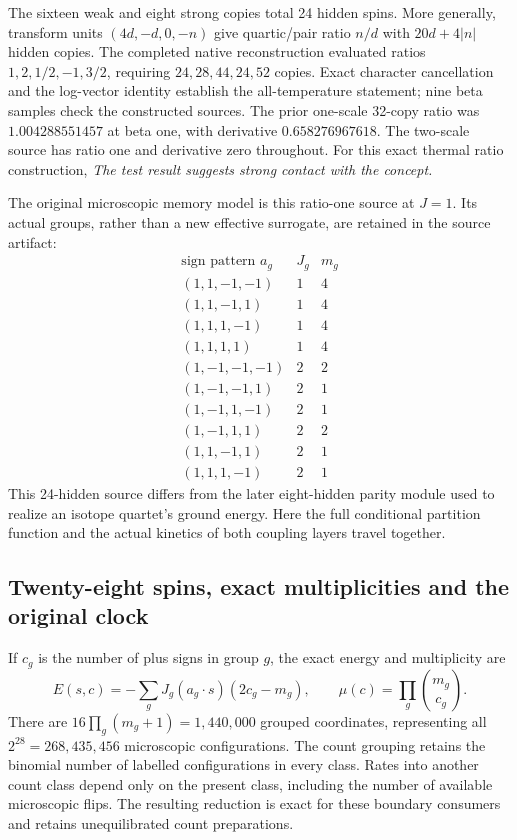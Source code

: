 The sixteen weak and eight strong copies total 24 hidden spins. More
generally, transform units \((4d,-d,0,-n)\) give quartic/pair ratio \(n/d\)
with \(20d+4|n|\) hidden copies. The completed native reconstruction
evaluated ratios \(1,2,1/2,-1,3/2\), requiring \(24,28,44,24,52\) copies.
Exact character cancellation and the log-vector identity establish the
all-temperature statement; nine beta samples check the constructed
sources. The prior one-scale 32-copy ratio was \(1.004288551457\) at
beta one, with derivative \(0.658276967618\). The two-scale source
has ratio one and derivative zero throughout. For this exact thermal
ratio construction, \emph{The test result suggests strong contact with
the concept.}

The original microscopic memory model is this ratio-one source at \(J=1\).
Its actual groups, rather than a new effective surrogate, are retained in
the source artifact:
\[
\begin{array}{c|c|c}
\text{sign pattern }a_g&J_g&m_g\\
\hline
(1,1,-1,-1)&1&4\\
(1,1,-1,1)&1&4\\
(1,1,1,-1)&1&4\\
(1,1,1,1)&1&4\\
(1,-1,-1,-1)&2&2\\
(1,-1,-1,1)&2&1\\
(1,-1,1,-1)&2&1\\
(1,-1,1,1)&2&2\\
(1,1,-1,1)&2&1\\
(1,1,1,-1)&2&1
\end{array}
\]
This 24-hidden source differs from the later eight-hidden parity module
used to realize an isotope quartet's ground energy. Here the full
conditional partition function and the actual kinetics of both coupling
layers travel together.

\subsection{Twenty-eight spins, exact multiplicities and the original clock}

If \(c_g\) is the number of plus signs in group \(g\), the exact energy
and multiplicity are
\[
 E(s,c)=-\sum_gJ_g(a_g\cdot s)(2c_g-m_g),\qquad
 \mu(c)=\prod_g\binom{m_g}{c_g}.
\]
There are \(16\prod_g(m_g+1)=1{,}440{,}000\) grouped coordinates,
representing all \(2^{28}=268{,}435{,}456\) microscopic configurations.
The count grouping retains the binomial number of labelled configurations
in every class. Rates into another count class depend only on the
present class, including the number of available microscopic flips.
The resulting reduction is exact for these boundary consumers and
retains unequilibrated count preparations.

